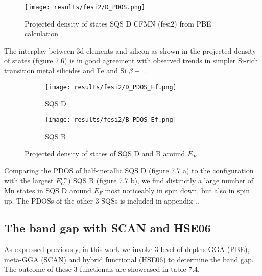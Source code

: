 \begin{figure}[H]
	\centering
	\texttt{[image: results/fesi2/D\_PDOS.png]}
	\caption{Projected density of states SQS D CFMN (fesi2) from PBE calculation}
\end{figure} 

The interplay between 3d elements and silicon as shown in the projected density of states (figure 7.6) is in good agreement with observed trends in simpler Si-rich transition metal silicides \cite{lange1997electronic} and Fe and Si $\beta-$  \cite{doi:10.1063/1.346415}.
\begin{figure}[H]
	\begin{subfigure}{.5\textwidth}
			\texttt{[image: results/fesi2/D\_PDOS\_Ef.png]}
			\caption{SQS D}		
	\end{subfigure}
	\begin{subfigure}{.5\textwidth}
		\texttt{[image: results/fesi2/B\_PDOS\_Ef.png]}
		\caption{SQS B}		
	\end{subfigure}
	\caption{Projected density of states of SQS D and B around $E_F$}
\end{figure}

Comparing the PDOS of half-metallic SQS D (figure 7.7 a) to the configuration with the largest $E_G ^\text{dw}$) SQS B (figure 7.7 b), we find distinctly a large number of Mn states in SQS D around $E_F$ most noticeably in spin down, but also in spin up. The PDOSs of the other 3 SQSs is included in appendix .. 

\subsection{The band gap with SCAN and HSE06}
As expressed previously, in this work we invoke 3 level of depths GGA (PBE), meta-GGA (SCAN) and hybrid functional (HSE06) to determine the band gap. The outcome of these 3 functionals are showcased in table 7.4.

